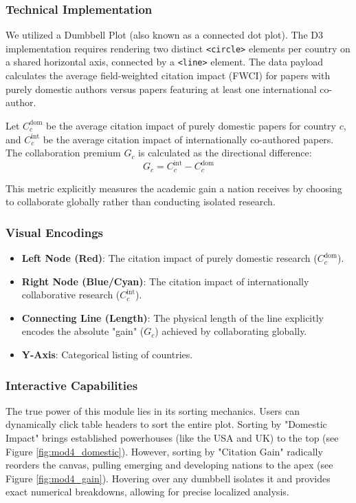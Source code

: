 \documentclass[12pt,a4paper]{article}
\begin{document}
\subsubsection{Technical Implementation}
We utilized a Dumbbell Plot (also known as a connected dot plot). The D3 implementation requires rendering two distinct \texttt{<circle>} elements per country on a shared horizontal axis, connected by a \texttt{<line>} element. The data payload calculates the average field-weighted citation impact (FWCI) for papers with purely domestic authors versus papers featuring at least one international co-author.

Let $C^{\text{dom}}_c$ be the average citation impact of purely domestic papers for country $c$, and $C^{\text{int}}_c$ be the average citation impact of internationally co-authored papers. The collaboration premium $G_c$ is calculated as the directional difference:
\begin{equation}
G_c = C^{\text{int}}_c - C^{\text{dom}}_c
\end{equation}

This metric explicitly measures the academic gain a nation receives by choosing to collaborate globally rather than conducting isolated research.

\subsubsection{Visual Encodings}
\begin{itemize}
    \item \textbf{Left Node (Red)}: The citation impact of purely domestic research ($C^{\text{dom}}_c$).
    \item \textbf{Right Node (Blue/Cyan)}: The citation impact of internationally collaborative research ($C^{\text{int}}_c$).
    \item \textbf{Connecting Line (Length)}: The physical length of the line explicitly encodes the absolute "gain" ($G_c$) achieved by collaborating globally.
    \item \textbf{Y-Axis}: Categorical listing of countries.
\end{itemize}

\subsubsection{Interactive Capabilities}
The true power of this module lies in its sorting mechanics. Users can dynamically click table headers to sort the entire plot. Sorting by "Domestic Impact" brings established powerhouses (like the USA and UK) to the top (see Figure \ref{fig:mod4_domestic}). However, sorting by "Citation Gain" radically reorders the canvas, pulling emerging and developing nations to the apex (see Figure \ref{fig:mod4_gain}). Hovering over any dumbbell isolates it and provides exact numerical breakdowns, allowing for precise localized analysis.
\end{document}
